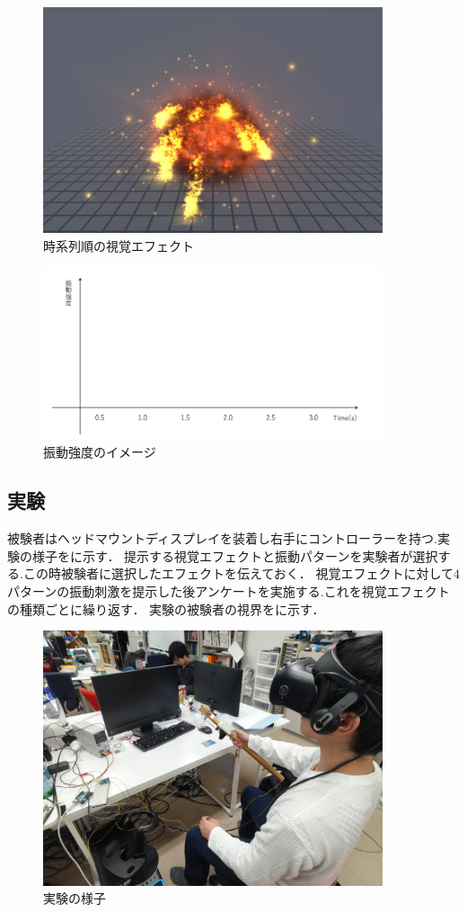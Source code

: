 \begin{figure}[h]
\centering
\includegraphics[clip,width=10cm]{./fig/explosion.png}
\caption{時系列順の視覚エフェクト}\label{expTime}
\end{figure}

\begin{figure}[h]
\centering
\includegraphics[clip,width=10cm]{./fig/ank.png}
\caption{振動強度のイメージ}\label{ank}
\end{figure}

\newpage

\subsection{実験}
被験者はヘッドマウントディスプレイを装着し右手にコントローラーを持つ.実験の様子をに示す．
提示する視覚エフェクトと振動パターンを実験者が選択する.この時被験者に選択したエフェクトを伝えておく．
視覚エフェクトに対して4パターンの振動刺激を提示した後アンケートを実施する.これを視覚エフェクトの種類ごとに繰り返す．
実験の被験者の視界をに示す．

\begin{figure}[h]
\centering
\includegraphics[clip,width=10cm]{./fig/jikken.png}
\caption{実験の様子}\label{jikken}
\end{figure}



